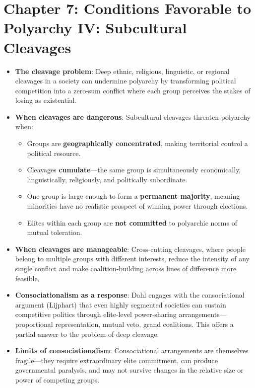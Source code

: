 \documentclass[12pt]{article}
\begin{document}
\section{Chapter 7: Conditions Favorable to Polyarchy IV: Subcultural Cleavages}

\begin{itemize}[leftmargin=*, itemsep=4pt]
    \item \textbf{The cleavage problem}: Deep ethnic, religious, linguistic, or regional cleavages in a society can undermine polyarchy by transforming political competition into a zero-sum conflict where each group perceives the stakes of losing as existential.
    \item \textbf{When cleavages are dangerous}: Subcultural cleavages threaten polyarchy when:
        \begin{itemize}
            \item Groups are \textbf{geographically concentrated}, making territorial control a political resource.
            \item Cleavages \textbf{cumulate}---the same group is simultaneously economically, linguistically, religiously, and politically subordinate.
            \item One group is large enough to form a \textbf{permanent majority}, meaning minorities have no realistic prospect of winning power through elections.
            \item Elites within each group are \textbf{not committed} to polyarchic norms of mutual toleration.
        \end{itemize}
    \item \textbf{When cleavages are manageable}: Cross-cutting cleavages, where people belong to multiple groups with different interests, reduce the intensity of any single conflict and make coalition-building across lines of difference more feasible.
    \item \textbf{Consociationalism as a response}: Dahl engages with the consociational argument (Lijphart) that even highly segmented societies can sustain competitive politics through elite-level power-sharing arrangements---proportional representation, mutual veto, grand coalitions. This offers a partial answer to the problem of deep cleavage.
    \item \textbf{Limits of consociationalism}: Consociational arrangements are themselves fragile---they require extraordinary elite commitment, can produce governmental paralysis, and may not survive changes in the relative size or power of competing groups.

\end{itemize}
\end{document}
